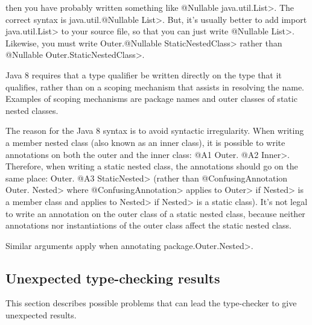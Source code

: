 \begin{itemize}
\noindent
\begin{sloppypar}
then you have probably written something like \<@Nullable java.util.List>.
The correct syntax is \<java.util.@Nullable List>.  But, it's usually
better to add \<import java.util.List> to your source file, so that you can
just write \<@Nullable List>.  Likewise, you must write \<Outer.@Nullable
StaticNestedClass> rather than \<@Nullable Outer.StaticNestedClass>.
\end{sloppypar}

Java 8 requires that a type qualifier be written directly on the type that
it qualifies, rather than on a scoping mechanism that assists in resolving
the name.  Examples of scoping mechanisms are package names and outer
classes of static nested classes.

The reason for the Java 8 syntax is to avoid syntactic irregularity.  When
writing a member nested class (also known as an inner class), it is
possible to write annotations on both the outer and the inner class:  \<@A1
Outer. @A2 Inner>.  Therefore, when writing a static nested class, the
annotations should go on the same place:  \<Outer. @A3 StaticNested> (rather
than \<@ConfusingAnnotation Outer. Nested> where
\<@ConfusingAnnotation> applies to \<Outer> if \<Nested> is a member class
and applies to \<Nested> if \<Nested> is a static class).  It's not legal
to write an annotation on the outer class of a static nested class, because
neither annotations nor instantiations of the outer class affect the static
nested class.

Similar arguments apply when annotating \<package.Outer.Nested>.

\end{itemize}


\subsection{Unexpected type-checking results\label{common-problems-typechecking}}

This section describes possible problems that can lead the type-checker to
give unexpected results.


